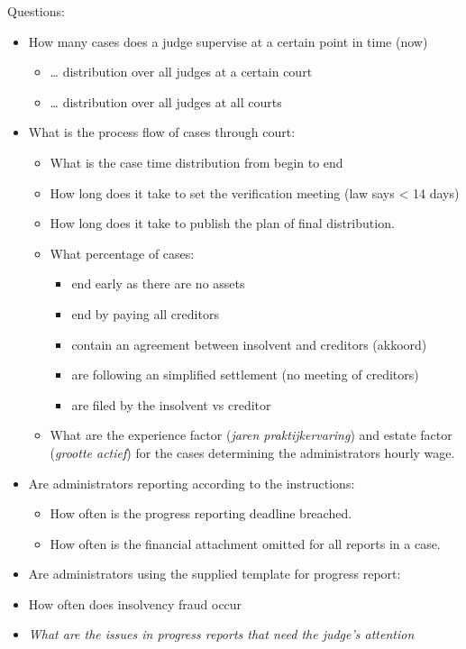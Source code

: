 Questions:
\begin{itemize}
	\item How many cases does a judge supervise at a certain point in time (now)
	\begin{itemize}
		\item … distribution over all judges at a certain court
		\item … distribution over all judges at all courts
	\end{itemize}
	\item What is the process flow of cases through court: 
	\begin{itemize}
		\item What is the case time distribution from begin to end
		\item How long does it take to set the verification meeting (law says < 14 days)
		\item How long does it take to publish the plan of final distribution.
		\item What percentage of cases:
		\begin{itemize}
			\item end early as there are no assets
			\item end by paying all creditors
			\item contain an agreement between insolvent and creditors (akkoord)
			\item are following an simplified settlement (no meeting of creditors)	
			\item are filed by the insolvent vs creditor
		\end{itemize}
		\item What are the experience factor (\textit{jaren praktijkervaring}) and estate factor (\textit{grootte actief}) for the cases determining the administrators hourly wage.
	\end{itemize}
	
	\item Are administrators reporting according to the instructions:
	\begin{itemize}
		\item How often is the progress reporting deadline breached.
		\item How often is the financial attachment omitted for all reports in a case.
	\end{itemize}
	\item Are administrators using the supplied template for progress report:
	\item How often does insolvency fraud occur
	\item \textit{What are the issues in progress reports that need the judge's attention}
\end{itemize}

